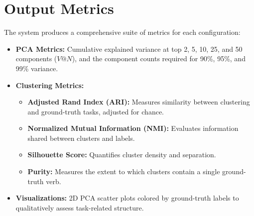 \documentclass{article}
\begin{document}
\section{Output Metrics}
The system produces a comprehensive suite of metrics for each configuration:
\begin{itemize}
    \item \textbf{PCA Metrics:} Cumulative explained variance at top 2, 5, 10, 25, and 50 components ($V@N$), and the component counts required for 90\%, 95\%, and 99\% variance.
    \item \textbf{Clustering Metrics:}
    \begin{itemize}
        \item \textbf{Adjusted Rand Index (ARI):} Measures similarity between clustering and ground-truth tasks, adjusted for chance.
        \item \textbf{Normalized Mutual Information (NMI):} Evaluates information shared between clusters and labels.
        \item \textbf{Silhouette Score:} Quantifies cluster density and separation.
        \item \textbf{Purity:} Measures the extent to which clusters contain a single ground-truth verb.
    \end{itemize}
    \item \textbf{Visualizations:} 2D PCA scatter plots colored by ground-truth labels to qualitatively assess task-related structure.
\end{itemize}
\end{document}
